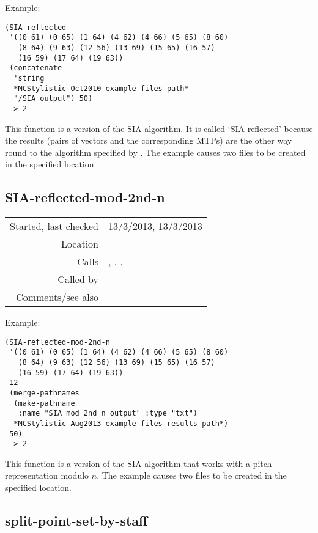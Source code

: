 \vspace{0.5cm}
\noindent Example:
\begin{verbatim}
(SIA-reflected
 '((0 61) (0 65) (1 64) (4 62) (4 66) (5 65) (8 60)
   (8 64) (9 63) (12 56) (13 69) (15 65) (16 57)
   (16 59) (17 64) (19 63))
 (concatenate
  'string
  *MCStylistic-Oct2010-example-files-path*
  "/SIA output") 50)
--> 2
\end{verbatim}

\noindent This function is a version of the SIA
algorithm. It is called `SIA-reflected' because the
results (pairs of vectors and the corresponding MTPs)
are the other way round to the algorithm specified by
\citet{meredith2002}. The example causes two files to
be created in the specified location.


\subsection*{SIA-reflected-mod-2nd-n}\label{fun:SIA-reflected-mod-2nd-n}

\vspace{0.3cm}
\begin{tabular}{r|p{8cm}}
Started, last checked & 13/3/2013, 13/3/2013 \\
Location & \nameref{sec:structural-induction-mod} \\
Calls & \nameref{fun:assoc-files}, \nameref{fun:subtract-two-lists-mod-2nd-n}, \nameref{fun:update-written-file}, \nameref{fun:write-to-file} \\
Called by & \\
Comments/see also & \nameref{fun:SIA-reflected}
\end{tabular}

\vspace{0.5cm}
\noindent Example:
\begin{verbatim}
(SIA-reflected-mod-2nd-n
 '((0 61) (0 65) (1 64) (4 62) (4 66) (5 65) (8 60)
   (8 64) (9 63) (12 56) (13 69) (15 65) (16 57)
   (16 59) (17 64) (19 63))
 12
 (merge-pathnames
  (make-pathname
   :name "SIA mod 2nd n output" :type "txt")
  *MCStylistic-Aug2013-example-files-results-path*)
 50)
--> 2
\end{verbatim}

\noindent This function is a version of the SIA
algorithm that works with a pitch representation
modulo $n$. The example causes two files to be created
in the specified location.


\subsection*{split-point-set-by-staff}\label{fun:split-point-set-by-staff}

